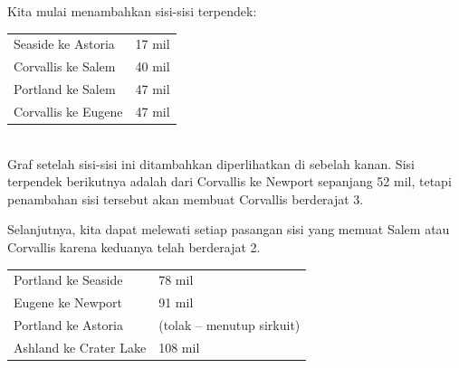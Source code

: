 \begin{example}{}
\begin{minipage}{0.5\textwidth}
Kita mulai menambahkan sisi-sisi terpendek:\\
\begin{tabular}{ll}
Seaside ke Astoria&	17 mil\\
Corvallis ke Salem	&40 mil\\
Portland ke Salem	&47 mil\\
Corvallis ke Eugene	&47 mil\\
\end{tabular}\\

Graf setelah sisi-sisi ini ditambahkan diperlihatkan di sebelah kanan.   Sisi terpendek berikutnya adalah dari Corvallis ke Newport sepanjang 52 mil, tetapi penambahan sisi tersebut akan membuat Corvallis berderajat 3.  \\
\end{minipage}
%
\begin{minipage}{0.5\textwidth}
\end{minipage}

\begin{minipage}{0.5\textwidth}
Selanjutnya, kita dapat melewati setiap pasangan sisi yang memuat Salem atau Corvallis karena keduanya telah berderajat 2.\\
\begin{tabular}{ll}
Portland ke Seaside& 		78 mil\\
Eugene ke Newport	&	91 mil\\
Portland ke Astoria	&	(tolak -- menutup sirkuit)\\
Ashland ke Crater Lake	&108 mil\\
\end{tabular}\\


\end{minipage}
\end{example}
